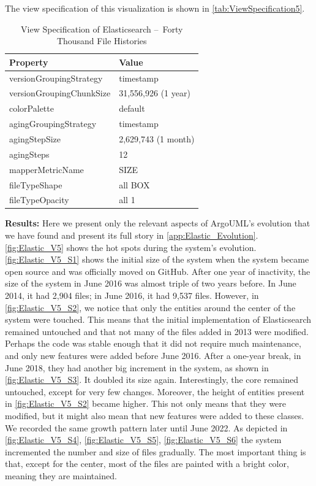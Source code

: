 The view specification of this visualization is shown in \autoref{tab:ViewSpecification5}.
\begin{table}[h]
	\small
    \centering
    \begin{tabular}{@{}ll@{}} 
        \toprule
        \textbf{Property} & \textbf{Value} \\\midrule
        versionGroupingStrategy & timestamp\\ 
		versionGroupingChunkSize & 31,556,926 (1 year)\\
		colorPalette & default\\
		agingGroupingStrategy & timestamp \\
		agingStepSize & 2,629,743 (1 month) \\
		agingSteps & 12 \\
		mapperMetricName & SIZE \\
		fileTypeShape & all BOX \\
		fileTypeOpacity & all 1 \\\bottomrule
    \end{tabular}
        \caption{View Specification of Elasticsearch – Forty Thousand File Histories}
    \label{tab:ViewSpecification5}
\end{table}

\bigbreak
\noindent
\textbf{Results:}
Here we present only the relevant aspects of ArgoUML's evolution that we have found and present its full story in \autoref{app:Elastic_Evolution}. \autoref{fig:Elastic_V5} shows the hot spots during the system's evolution. \autoref{fig:Elastic_V5_S1} shows the initial size of the system when the system became open source and was officially moved on GitHub. After one year of inactivity, the size of the system in June 2016 was almost triple of two years before. In June 2014, it had 2,904 files; in June 2016, it had 9,537 files. However, in \autoref{fig:Elastic_V5_S2}, we notice that only the entities around the center of the system were touched. This means that the initial implementation of Elasticsearch remained untouched and that not many of the files added in 2013 were modified. Perhaps the code was stable enough that it did not require much maintenance, and only new features were added before June 2016. After a one-year break, in June 2018, they had another big increment in the system, as shown in \autoref{fig:Elastic_V5_S3}. It doubled its size again. Interestingly, the core remained untouched, except for very few changes. Moreover, the height of entities present in \autoref{fig:Elastic_V5_S2} became higher. This not only means that they were modified, but it might also mean that new features were added to these classes. We recorded the same growth pattern later until June 2022. As depicted in \autoref{fig:Elastic_V5_S4}, \autoref{fig:Elastic_V5_S5}, \autoref{fig:Elastic_V5_S6} the system incremented the number and size of files gradually. The most important thing is that, except for the center, most of the files are painted with a bright color, meaning they are maintained. 



